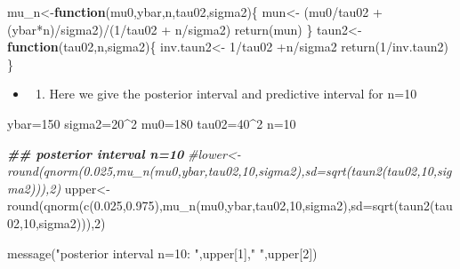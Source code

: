 \documentclass[
]{book}
\newenvironment{Shaded}{\begin{snugshade}}{\end{snugshade}}
\newcommand{\AttributeTok}[1]{\textcolor[rgb]{0.77,0.63,0.00}{#1}}
\newcommand{\CommentTok}[1]{\textcolor[rgb]{0.56,0.35,0.01}{\textit{#1}}}
\newcommand{\ControlFlowTok}[1]{\textcolor[rgb]{0.13,0.29,0.53}{\textbf{#1}}}
\newcommand{\DecValTok}[1]{\textcolor[rgb]{0.00,0.00,0.81}{#1}}
\newcommand{\DocumentationTok}[1]{\textcolor[rgb]{0.56,0.35,0.01}{\textbf{\textit{#1}}}}
\newcommand{\FloatTok}[1]{\textcolor[rgb]{0.00,0.00,0.81}{#1}}
\newcommand{\FunctionTok}[1]{\textcolor[rgb]{0.00,0.00,0.00}{#1}}
\newcommand{\NormalTok}[1]{#1}
\newcommand{\OtherTok}[1]{\textcolor[rgb]{0.56,0.35,0.01}{#1}}
\newcommand{\SpecialCharTok}[1]{\textcolor[rgb]{0.00,0.00,0.00}{#1}}
\newcommand{\StringTok}[1]{\textcolor[rgb]{0.31,0.60,0.02}{#1}}
\providecommand{\tightlist}{%
  \setlength{\itemsep}{0pt}\setlength{\parskip}{0pt}}
\theoremstyle{definition}
\theoremstyle{definition}
\theoremstyle{definition}
\theoremstyle{definition}
\theoremstyle{remark}
\begin{document}
\begin{Shaded}
\begin{Highlighting}[]
\NormalTok{mu\_n}\OtherTok{\textless{}{-}}\ControlFlowTok{function}\NormalTok{(mu0,ybar,n,tau02,sigma2)\{}
\NormalTok{  mun}\OtherTok{\textless{}{-}}\NormalTok{ (mu0}\SpecialCharTok{/}\NormalTok{tau02 }\SpecialCharTok{+}\NormalTok{ (ybar}\SpecialCharTok{*}\NormalTok{n)}\SpecialCharTok{/}\NormalTok{sigma2)}\SpecialCharTok{/}\NormalTok{(}\DecValTok{1}\SpecialCharTok{/}\NormalTok{tau02 }\SpecialCharTok{+}\NormalTok{ n}\SpecialCharTok{/}\NormalTok{sigma2)}
  \FunctionTok{return}\NormalTok{(mun)}
\NormalTok{\}}
\NormalTok{taun2}\OtherTok{\textless{}{-}}\ControlFlowTok{function}\NormalTok{(tau02,n,sigma2)\{}
\NormalTok{  inv.taun2}\OtherTok{\textless{}{-}} \DecValTok{1}\SpecialCharTok{/}\NormalTok{tau02 }\SpecialCharTok{+}\NormalTok{n}\SpecialCharTok{/}\NormalTok{sigma2}
  \FunctionTok{return}\NormalTok{(}\DecValTok{1}\SpecialCharTok{/}\NormalTok{inv.taun2)}
\NormalTok{\}}
\end{Highlighting}
\end{Shaded}

\begin{itemize}
\item
  \begin{enumerate}
  \def\labelenumi{(\alph{enumi})}
  \setcounter{enumi}{2}
  \tightlist
  \item
    Here we give the posterior interval and predictive interval for n=10
  \end{enumerate}
\end{itemize}

\begin{Shaded}
\begin{Highlighting}[]
\NormalTok{ybar}\OtherTok{=}\DecValTok{150}
\NormalTok{sigma2}\OtherTok{=}\DecValTok{20}\SpecialCharTok{\^{}}\DecValTok{2}
\NormalTok{mu0}\OtherTok{=}\DecValTok{180}
\NormalTok{  tau02}\OtherTok{=}\DecValTok{40}\SpecialCharTok{\^{}}\DecValTok{2}
\NormalTok{  n}\OtherTok{=}\DecValTok{10}

\DocumentationTok{\#\# posterior interval n=10}
  \CommentTok{\#lower\textless{}{-}round(qnorm(0.025,mu\_n(mu0,ybar,tau02,10,sigma2),sd=sqrt(taun2(tau02,10,sigma2))),2)}
\NormalTok{    upper}\OtherTok{\textless{}{-}}\FunctionTok{round}\NormalTok{(}\FunctionTok{qnorm}\NormalTok{(}\FunctionTok{c}\NormalTok{(}\FloatTok{0.025}\NormalTok{,}\FloatTok{0.975}\NormalTok{),}\FunctionTok{mu\_n}\NormalTok{(mu0,ybar,tau02,}\DecValTok{10}\NormalTok{,sigma2),}\AttributeTok{sd=}\FunctionTok{sqrt}\NormalTok{(}\FunctionTok{taun2}\NormalTok{(tau02,}\DecValTok{10}\NormalTok{,sigma2))),}\DecValTok{2}\NormalTok{)}

\FunctionTok{message}\NormalTok{(}\StringTok{"posterior interval n=10: "}\NormalTok{,upper[}\DecValTok{1}\NormalTok{],}\StringTok{" "}\NormalTok{,upper[}\DecValTok{2}\NormalTok{])}
\end{Highlighting}
\end{Shaded}
\end{document}
